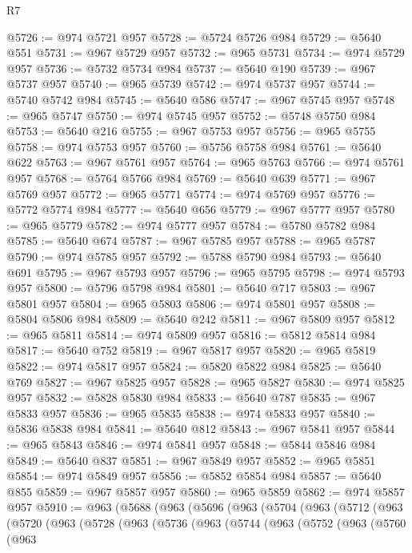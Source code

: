 \begin{lexlean}{R7}
\begin{coremodule}
@5726 := @974 @5721 @957
@5728 := @5724 @5726 @984
@5729 := @5640 @551
@5731 := @967 @5729 @957
@5732 := @965 @5731
@5734 := @974 @5729 @957
@5736 := @5732 @5734 @984
@5737 := @5640 @190
@5739 := @967 @5737 @957
@5740 := @965 @5739
@5742 := @974 @5737 @957
@5744 := @5740 @5742 @984
@5745 := @5640 @586
@5747 := @967 @5745 @957
@5748 := @965 @5747
@5750 := @974 @5745 @957
@5752 := @5748 @5750 @984
@5753 := @5640 @216
@5755 := @967 @5753 @957
@5756 := @965 @5755
@5758 := @974 @5753 @957
@5760 := @5756 @5758 @984
@5761 := @5640 @622
@5763 := @967 @5761 @957
@5764 := @965 @5763
@5766 := @974 @5761 @957
@5768 := @5764 @5766 @984
@5769 := @5640 @639
@5771 := @967 @5769 @957
@5772 := @965 @5771
@5774 := @974 @5769 @957
@5776 := @5772 @5774 @984
@5777 := @5640 @656
@5779 := @967 @5777 @957
@5780 := @965 @5779
@5782 := @974 @5777 @957
@5784 := @5780 @5782 @984
@5785 := @5640 @674
@5787 := @967 @5785 @957
@5788 := @965 @5787
@5790 := @974 @5785 @957
@5792 := @5788 @5790 @984
@5793 := @5640 @691
@5795 := @967 @5793 @957
@5796 := @965 @5795
@5798 := @974 @5793 @957
@5800 := @5796 @5798 @984
@5801 := @5640 @717
@5803 := @967 @5801 @957
@5804 := @965 @5803
@5806 := @974 @5801 @957
@5808 := @5804 @5806 @984
@5809 := @5640 @242
@5811 := @967 @5809 @957
@5812 := @965 @5811
@5814 := @974 @5809 @957
@5816 := @5812 @5814 @984
@5817 := @5640 @752
@5819 := @967 @5817 @957
@5820 := @965 @5819
@5822 := @974 @5817 @957
@5824 := @5820 @5822 @984
@5825 := @5640 @769
@5827 := @967 @5825 @957
@5828 := @965 @5827
@5830 := @974 @5825 @957
@5832 := @5828 @5830 @984
@5833 := @5640 @787
@5835 := @967 @5833 @957
@5836 := @965 @5835
@5838 := @974 @5833 @957
@5840 := @5836 @5838 @984
@5841 := @5640 @812
@5843 := @967 @5841 @957
@5844 := @965 @5843
@5846 := @974 @5841 @957
@5848 := @5844 @5846 @984
@5849 := @5640 @837
@5851 := @967 @5849 @957
@5852 := @965 @5851
@5854 := @974 @5849 @957
@5856 := @5852 @5854 @984
@5857 := @5640 @855
@5859 := @967 @5857 @957
@5860 := @965 @5859
@5862 := @974 @5857 @957
@5910 := @963
    (@5688
      (@963
        (@5696
          (@963
            (@5704
              (@963
                (@5712
                  (@963
                    (@5720
                      (@963
                        (@5728
                          (@963
                            (@5736
                              (@963
                                (@5744
                                  (@963
                                    (@5752
                                      (@963
                                        (@5760
                                          (@963

\end{coremodule}
\end{lexlean}
